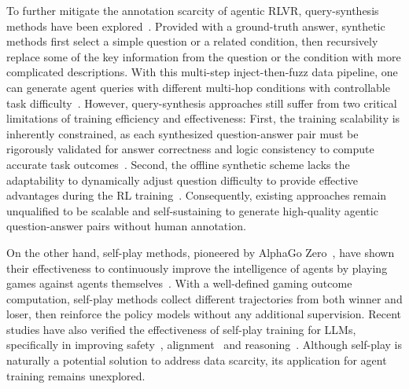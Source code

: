\documentclass[10pt, a4paper, logo]{googledeepmind} %
\begin{document}
To further mitigate the annotation scarcity of agentic RLVR, query-synthesis methods have been explored~\citep{li_websailor_2025,gao2025asearcher}. Provided with a ground-truth answer, synthetic methods first select a simple question or a related condition, then recursively replace some of the key information from the question or the condition with more complicated descriptions. With this multi-step inject-then-fuzz data pipeline, one can generate agent queries with different multi-hop conditions with controllable task difficulty~\citep{li2025websailor}.
%
%
%
However, query-synthesis approaches still suffer from two critical limitations of training efficiency and effectiveness: 
First, the training scalability is inherently constrained, as each synthesized question-answer pair must be rigorously validated for answer correctness and logic consistency to compute accurate task outcomes~\citep{Villalobos2024Position}.
Second, the offline synthetic scheme lacks the adaptability to dynamically adjust question difficulty to provide effective advantages during the RL training~\citep{guo2025synthetic}.
Consequently, existing approaches remain unqualified to be scalable and self-sustaining to generate high-quality agentic question-answer pairs without human annotation.

On the other hand, self-play methods, pioneered by AlphaGo Zero~\citep{silver2017mastering}, have shown their effectiveness to continuously improve the intelligence of agents by playing games against agents themselves~\citep{schrittwieser2020mastering,zha2021douzero}. With a well-defined gaming outcome computation, self-play methods collect different trajectories from both winner and loser, then reinforce the policy models without any additional supervision. Recent studies have also verified the effectiveness of self-play training for LLMs, specifically in improving safety~\citep{deng2025duoguard,liu2025chasing}, alignment~\citep{chen2024self,cheng2024adversarial} and reasoning~\citep{cheng2024spag,chen2025spc}. Although self-play is naturally a potential solution to address data scarcity, its application for agent training remains unexplored. 
\end{document}
